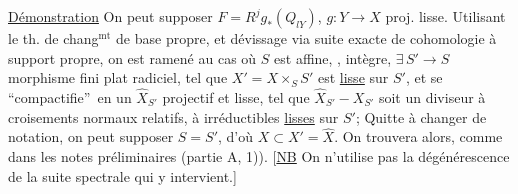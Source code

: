 \uline{Démonstration} On  peut supposer $F=R^jg_*(Q_{lY})$, $g:Y\longrightarrow X$ proj. lisse.  Utilisant le th. de chang$^{\mathrm{mt}}$ de base propre,  et dévissage via suite exacte de cohomologie à support propre, on est ramené au cas où  $S$ est affine, , intègre, $\exists\, S'\longrightarrow S$ morphisme fini plat radiciel,  tel que $X'=X\times_S S'$ est \uline{lisse} sur $S'$, et se \textquotedblleft compactifie\textquotedblright\ en un $\widehat X_{S'}$  projectif et lisse, tel que $\widehat X_{S'}-X_{S'}$ soit un diviseur à croisements normaux relatifs, à  irréductibles \uline{lisses} sur $S'$;   Quitte à changer de notation, on peut supposer $S=S'$,  d'où $X\subset X'=\hat X$. On trouvera alors,  comme dans les notes préliminaires (partie A, 1)). [\uline{NB} On n'utilise pas la dégénérescence de la suite spectrale qui y intervient.]
